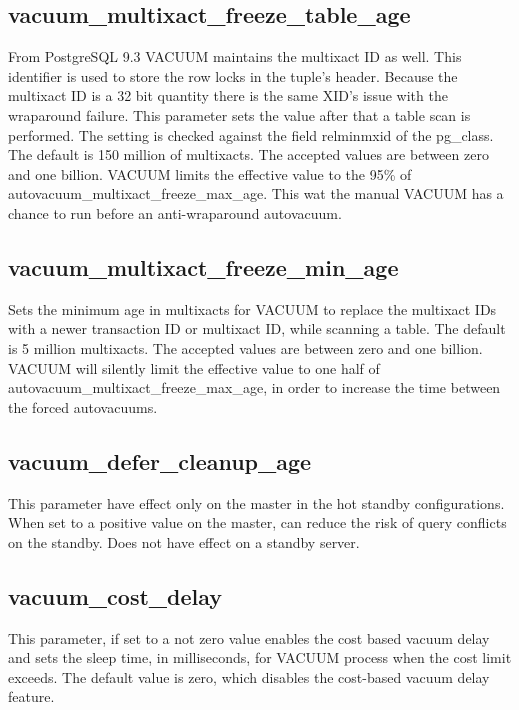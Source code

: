 \subsection{vacuum\_multixact\_freeze\_table\_age}
From PostgreSQL 9.3 VACUUM maintains the multixact ID as well. This identifier is used to store the
row locks in the tuple's header.  Because the multixact ID is a 32 bit quantity there
is the same XID's issue with the wraparound failure. This parameter
sets the value after that a table scan is performed. The setting is checked against the field relminmxid of
the pg\_class. The default is 150 million of multixacts. The accepted values are between zero and one
billion. VACUUM limits the effective value to the 95\% of autovacuum\_multixact\_freeze\_max\_age. This wat
the manual VACUUM has a chance to run before an anti-wraparound autovacuum.

\subsection{vacuum\_multixact\_freeze\_min\_age}
Sets the minimum age in multixacts for VACUUM to replace the multixact IDs with a newer transaction ID or
multixact ID, while scanning a table. The default is 5 million multixacts. The accepted values
are between zero and one billion. VACUUM will silently limit the effective value to one half of
autovacuum\_multixact\_freeze\_max\_age, in order to increase the time between the forced autovacuums.

\subsection{vacuum\_defer\_cleanup\_age}
This parameter have effect only on the master in the hot standby configurations. When set to a positive
value on the master, can reduce the risk of query conflicts on the standby. Does not have effect on a
standby server.

\subsection{vacuum\_cost\_delay}\label{sub:VACUUMCOST}
This parameter, if set to a not zero value enables the cost based vacuum delay and sets the sleep time, in milliseconds, for VACUUM process when the cost limit exceeds. The
default value is zero, which disables the cost-based vacuum delay feature.

